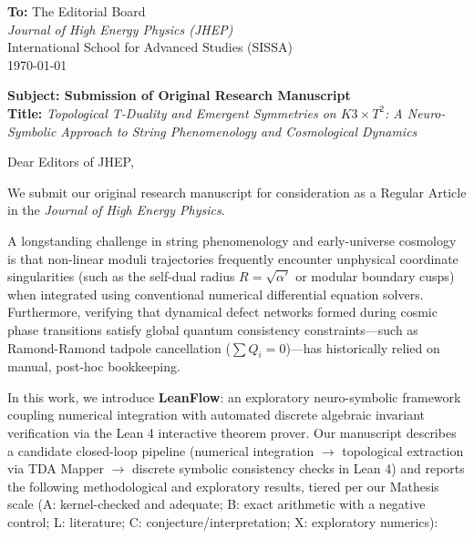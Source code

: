 \documentclass[11pt]{letter}
\begin{document}
\begin{flushleft}
\textbf{To:} The Editorial Board \\
\textit{Journal of High Energy Physics (JHEP)} \\
International School for Advanced Studies (SISSA) \\
\today
\end{flushleft}

\vspace{1em}

\noindent\textbf{Subject: Submission of Original Research Manuscript} \\
\textbf{Title:} \textit{Topological T-Duality and Emergent Symmetries on $K3 \times T^2$: A Neuro-Symbolic Approach to String Phenomenology and Cosmological Dynamics}

\vspace{1.5em}

\noindent Dear Editors of JHEP,

We submit our original research manuscript for consideration as a Regular Article in the \textit{Journal of High Energy Physics}.

A longstanding challenge in string phenomenology and early-universe cosmology is that non-linear moduli trajectories frequently encounter unphysical coordinate singularities (such as the self-dual radius $R = \sqrt{\alpha'}$ or modular boundary cusps) when integrated using conventional numerical differential equation solvers. Furthermore, verifying that dynamical defect networks formed during cosmic phase transitions satisfy global quantum consistency constraints—such as Ramond-Ramond tadpole cancellation ($\sum Q_i = 0$)—has historically relied on manual, post-hoc bookkeeping.

In this work, we introduce \textbf{LeanFlow}: an exploratory neuro-symbolic framework coupling numerical integration with automated discrete algebraic invariant verification via the Lean 4 interactive theorem prover. Our manuscript describes a candidate closed-loop pipeline (numerical integration $\to$ topological extraction via TDA Mapper $\to$ discrete symbolic consistency checks in Lean 4) and reports the following methodological and exploratory results, tiered per our Mathesis scale (A: kernel-checked and adequate; B: exact arithmetic with a negative control; L: literature; C: conjecture/interpretation; X: exploratory numerics):
\end{document}
